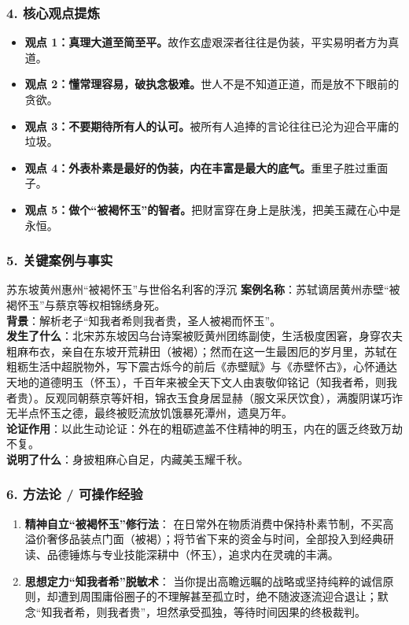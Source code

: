 \subsubsection{4. 核心观点提炼}
\begin{itemize}
    \item \textbf{观点 1：真理大道至简至平。}故作玄虚艰深者往往是伪装，平实易明者方为真道。
    \item \textbf{观点 2：懂常理容易，破执念极难。}世人不是不知道正道，而是放不下眼前的贪欲。
    \item \textbf{观点 3：不要期待所有人的认可。}被所有人追捧的言论往往已沦为迎合平庸的垃圾。
    \item \textbf{观点 4：外表朴素是最好的伪装，内在丰富是最大的底气。}重里子胜过重面子。
    \item \textbf{观点 5：做个“被褐怀玉”的智者。}把财富穿在身上是肤浅，把美玉藏在心中是永恒。
\end{itemize}

\subsubsection{5. 关键案例与事实}
\begin{CaseBox}{苏东坡黄州惠州“被褐怀玉”与世俗名利客的浮沉}
\textbf{案例名称}：苏轼谪居黄州赤壁“被褐怀玉”与蔡京等权相锦绣身死。\\
\textbf{背景}：解析老子“知我者希则我者贵，圣人被褐而怀玉”。\\
\textbf{发生了什么}：北宋苏东坡因乌台诗案被贬黄州团练副使，生活极度困窘，身穿农夫粗麻布衣，亲自在东坡开荒耕田（被褐）；然而在这一生最困厄的岁月里，苏轼在粗粝生活中超脱物外，写下震古烁今的前后《赤壁赋》与《赤壁怀古》，心怀通达天地的道德明玉（怀玉），千百年来被全天下文人由衷敬仰铭记（知我者希，则我者贵）。反观同朝蔡京等奸相，锦衣玉食身居显赫（服文采厌饮食），满腹阴谋巧诈无半点怀玉之德，最终被贬流放饥饿暴死潭州，遗臭万年。\\
\textbf{论证作用}：以此生动论证：外在的粗砺遮盖不住精神的明玉，内在的匮乏终致万劫不复。\\
\textbf{说明了什么}：身披粗麻心自足，内藏美玉耀千秋。
\end{CaseBox}

\subsubsection{6. 方法论 / 可操作经验}
\begin{enumerate}
    \item \textbf{精神自立“被褐怀玉”修行法}：
    在日常外在物质消费中保持朴素节制，不买高溢价奢侈品装点门面（被褐）；将节省下来的资金与时间，全部投入到经典研读、品德锤炼与专业技能深耕中（怀玉），追求内在灵魂的丰满。
    \item \textbf{思想定力“知我者希”脱敏术}：
    当你提出高瞻远瞩的战略或坚持纯粹的诚信原则，却遭到周围庸俗圈子的不理解甚至孤立时，绝不随波逐流迎合退让；默念“知我者希，则我者贵”，坦然承受孤独，等待时间因果的终极裁判。
\end{enumerate}

